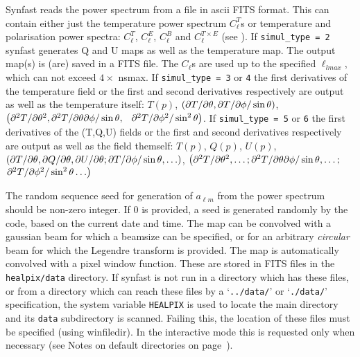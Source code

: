 \begin{codedescription}
{%
Synfast reads the power spectrum from a file in  ascii FITS
format. This can contain either just the temperature power spectrum $C^T_{\ell}$s or 
temperature and polarisation power spectra: $C^T_{\ell}$, $C^E_{\ell}$, $C^B_{\ell}$
and $C^{T\times E}_{\ell}$ (see ). If {\tt simul\_type = 2} synfast generates 
Q and U maps as well as the temperature map. The output map(s)
is (are) saved in a FITS file. 
The $C_{\ell}$s are used up to the specified 
$\ell_{lmax}$, which can not exceed $4\times$ nsmax. If {\tt simul\_type = 3} or
{\tt 4} the first derivatives of the temperature field or the first and second derivatives respectively
are output as well as the temperature itself: $T(p)$, $\left({\partial T}/{\partial \theta}, {\partial T}/{\partial \phi}/\sin\theta \right)
$, $\left({\partial^2 T}/{\partial \theta^2}, {\partial^2 T}/{\partial
  \theta\partial\phi}/\sin\theta,\right.$ 
$\left.{\partial^2 T}/{\partial \phi^2}/\sin^2\theta \right)$.
If {\tt simul\_type = 5} or
{\tt 6} the first derivatives of the (T,Q,U) fields or the first and second derivatives respectively
are output as well as the field themself: $T(p)$,  $Q(p)$,  $U(p)$,
$\left({\partial T}/{\partial \theta}, {\partial Q}/{\partial \theta}, {\partial
  U}/{\partial \theta}; {\partial T}/{\partial \phi}/\sin\theta, \ldots \right)
$, $\left({\partial^2 T}/{\partial \theta^2},\ldots; {\partial^2 T}/{\partial
  \theta\partial\phi}/\sin\theta,\ldots ;\right.$ 
$\left.{\partial^2 T}/{\partial \phi^2}/\sin^2\theta \ldots \right)$

The random sequence seed for generation of $a_{\ell m}$ from the
power spectrum should be non-zero integer. If 0 is provided, a seed is generated
randomly by the code, based on the current date and time.
The map can be convolved with a gaussian beam for which a beamsize can
be specified, or for an arbitrary {\em circular} beam for which the
Legendre transform is provided. The map is automatically convolved with a pixel window
function. These are stored in FITS files  in
the {\tt healpix/data} directory. If synfast is not run in a directory
which has these files, or from a directory which can reach these files
by a `{\tt ../data/}' or `{\tt ./data/}' specification, the system
variable {\tt HEALPIX} is used to locate the main \healpix directory
and its {\tt data} subdirectory is scanned. Failing this, the location of these
files must be specified (using winfiledir). In the interactive mode this is
requested only when necessary (see Notes on default directories on page~\pageref{page:defdir}).

}
\end{codedescription}
